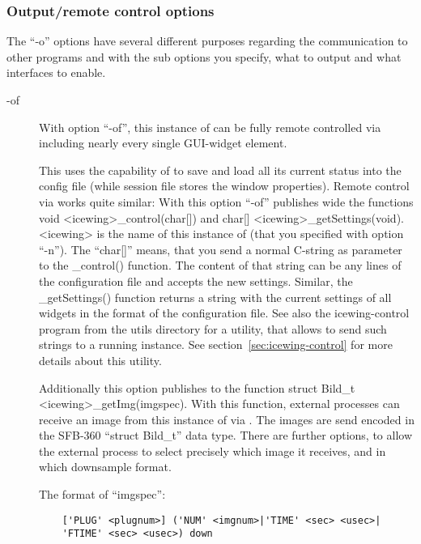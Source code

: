 \subsubsection {Output/remote control options}

The ``-o'' options have several different purposes regarding the
communication to other programs and with the sub options
you specify, what to output and what interfaces to enable.

\begin{description}

\item[-of]
  \label{page:opt_of}
  With option ``-of'', this instance of \icewing{} can be fully
  remote controlled via \dacs{} including nearly every single
  GUI-widget element.

  This uses the capability of \icewing{} to save and load all its
  current status into the config file (while session file stores the
  window properties). Remote control via \dacs{} works quite
  similar: With this option ``-of'' \icewing{} publishes \dacs{}
  wide the functions
  void \textless{}icewing\textgreater{}\_control(char[]) and
  char[] \textless{}icewing\textgreater{}\_getSettings(void).
  \textless{}icewing\textgreater{} is the name of this instance of
  \icewing{} (that you specified with option ``-n''). The ``char[]''
  means, that you send a normal C-string as parameter to the
  \_control() function. The content of that string can be any lines
  of the \icewing{} configuration file and \icewing{} accepts the
  new settings. Similar, the \_getSettings() function returns a
  string with the current settings of all widgets in the format of
  the configuration file. See also the icewing-control program from
  the utils directory for a utility, that allows to send such
  strings to a running \icewing{} instance. See
  section~\ref{sec:icewing-control} for more details about this
  utility.

  Additionally this option publishes to \dacs{} the function
  struct Bild\_t \textless{}icewing\textgreater{}\_getImg(imgspec).
  With this function, external processes can receive an image from
  this instance of \icewing{} via \dacs{}. The images are send
  encoded in the SFB-360 ``struct Bild\_t'' data type. There are
  further options, to allow the external process to select precisely
  which image it receives, and in which downsample format. 

  The format of ``imgspec'':
\begin{verbatim}
    ['PLUG' <plugnum>] ('NUM' <imgnum>|'TIME' <sec> <usec>|
    'FTIME' <sec> <usec>) down
\end{verbatim}


\end{description}
